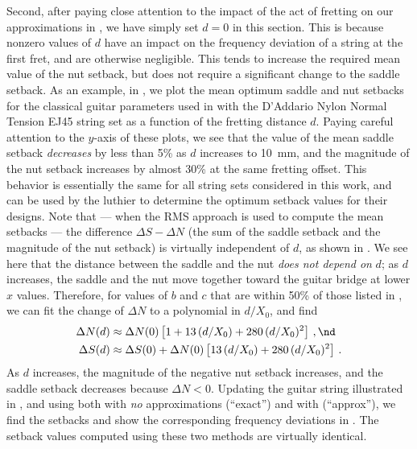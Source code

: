 Second, after paying close attention to the impact of the act of fretting on our approximations in , we have simply set $d = 0$ in this section. This is because nonzero values of $d$ have an impact on the frequency deviation of a string at the first fret, and are otherwise negligible. This tends to increase the required mean value of the nut setback, but does not require a significant change to the saddle setback. As an example, in , we plot the mean optimum saddle and nut setbacks for the classical guitar parameters used in  with the D'Addario Nylon Normal Tension EJ45 string set as a function of the fretting distance $d$. Paying careful attention to the $y$-axis of these plots, we see that the value of the mean saddle setback \emph{decreases} by less than 5\% as $d$ increases to 10~mm, and the magnitude of the nut setback increases by almost 30\% at the same fretting offset. This behavior is essentially the same for all string sets considered in this work, and can be used by the luthier to determine the optimum setback values for their designs. Note that --- when the RMS approach is used to compute the mean setbacks --- the difference $\Delta S - \Delta N$ (the sum of the saddle setback and the magnitude of the nut setback) is virtually independent of $d$, as shown in . We see here that the distance between the saddle and the nut \emph{does not depend on} $d$; as $d$ increases, the saddle and the nut move together toward the guitar bridge at lower $x$ values. Therefore, for values of $b$ and $c$ that are within 50\% of those listed in , we can fit the change of $\Delta N$ to a polynomial in $d/X_0$, and find
\begin{align} \label{eqn:comp_d_poly}
  \Delta N(d) &\approx \Delta N(0) \left[ 1 + 13\, (d/X_0) + 280\, (d/X_0)^2 \right]\, , \nd \\
  \Delta S(d) &\approx \Delta S(0) + \Delta N(0) \left[13\, (d/X_0) + 280\, (d/X_0)^2 \right]\, .
\end{align}
As $d$ increases, the magnitude of the negative nut setback increases, and the saddle setback decreases because $\Delta N < 0$. Updating the guitar string illustrated in , and using both  with \emph{no} approximations (``exact'') and  with  (``approx''), we find the setbacks and show the corresponding frequency deviations in . The setback values computed using these two methods are virtually identical.

